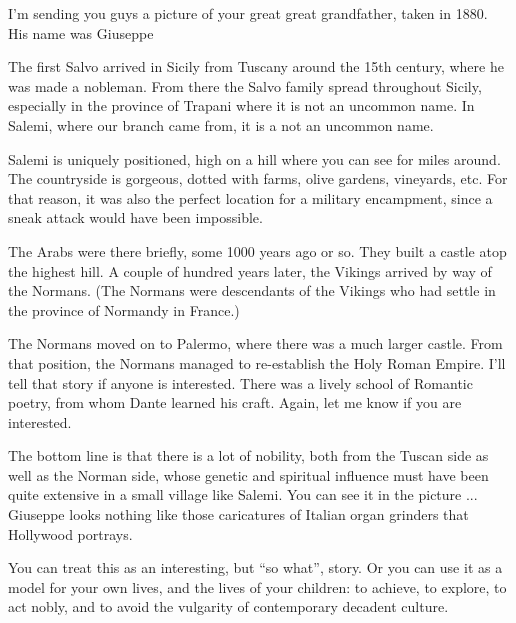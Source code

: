 \begin{quotationx}
I'm sending you guys a picture of your great great grandfather, taken in 1880. His name was Giuseppe

The first Salvo arrived in Sicily from Tuscany around the 15th century, where he was made a nobleman. From there the Salvo family spread throughout Sicily, especially in the province of Trapani where it is not an uncommon name. In Salemi, where our branch came from, it is a not an uncommon name.

Salemi is uniquely positioned, high on a hill where you can see for miles around. The countryside is gorgeous, dotted with farms, olive gardens, vineyards, etc. For that reason, it was also the perfect location for a military encampment, since a sneak attack would have been impossible.

The Arabs were there briefly, some 1000 years ago or so. They built a castle atop the highest hill. A couple of hundred years later, the Vikings arrived by way of the Normans. (The Normans were descendants of the Vikings who had settle in the province of Normandy in France.)

The Normans moved on to Palermo, where there was a much larger castle. From that position, the Normans managed to re-establish the Holy Roman Empire. I'll tell that story if anyone is interested. There was a lively school of Romantic poetry, from whom Dante learned his craft. Again, let me know if you are interested.

The bottom line is that there is a lot of nobility, both from the Tuscan side as well as the Norman side, whose genetic and spiritual influence must have been quite extensive in a small village like Salemi. You can see it in the picture ... Giuseppe looks nothing like those caricatures of Italian organ grinders that Hollywood portrays.

You can treat this as an interesting, but ``so what'', story. Or you can use it as a model for your own lives, and the lives of your children: to achieve, to explore, to act nobly, and to avoid the vulgarity of contemporary decadent culture.
\end{quotationx}





